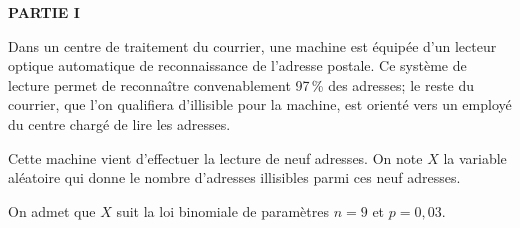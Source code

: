 \medskip





\textbf{PARTIE I}

\medskip

Dans un centre de traitement du courrier, une machine est équipée d'un lecteur optique automatique de reconnaissance de l'adresse postale. Ce système de lecture permet de reconnaître convenablement 97\,\% des adresses; le reste du courrier, que l'on qualifiera d'illisible pour la machine, est orienté vers un employé du centre chargé de lire les adresses. 

Cette machine vient d'effectuer la lecture de neuf adresses. On note $X$ la variable aléatoire qui donne le nombre d'adresses illisibles parmi ces neuf adresses.

On admet que $X$ suit la loi binomiale de paramètres $n = 9$ et $p = 0,03$.

\medskip

